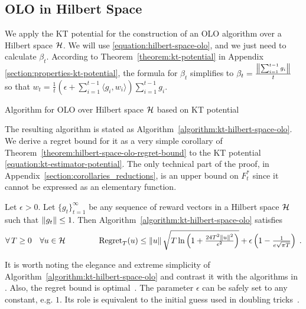 \vspace{-0.1cm}

\subsection{OLO in Hilbert Space}
\label{section:kt-olo}

We apply the KT potential for the construction of an OLO algorithm over a
Hilbert space $\mathcal{H}$. We will use \eqref{equation:hilbert-space-olo}, and we just
need to calculate $\beta_t$. According to Theorem~\ref{theorem:kt-potential} in
Appendix \ref{section:properties-kt-potential}, the formula for $\beta_t$
simplifies to $\beta_t = \frac{\left\|{\sum_{i=1}^{t-1} g_i}\right\|}{t}$ so that $w_t =
\tfrac{1}{t} \left(\epsilon + \sum_{i=1}^{t-1} \langle g_i, w_i \rangle \right)
\sum_{i=1}^{t-1} g_i$.

\begin{algorithm}[t]
\caption{Algorithm for OLO over Hilbert space $\mathcal{H}$ based on KT potential
\label{algorithm:kt-hilbert-space-olo}}
\begin{algorithmic}[1]
{
\ENDFOR
}
\end{algorithmic}
\end{algorithm}

The resulting algorithm is stated as
Algorithm~\ref{algorithm:kt-hilbert-space-olo}.  We derive a regret bound for
it as a very simple corollary of
Theorem~\ref{theorem:hilbert-space-olo-regret-bound} to the KT potential
\eqref{equation:kt-estimator-potential}. The only technical part of the proof,
in Appendix~\ref{section:corollaries_reductions}, is an upper bound on $F_t^*$
since it cannot be expressed as an elementary function.
%
\begin{corollary}
\label{corollary:kt-hilbert-space-olo-regret} Let $\epsilon > 0$. Let
$\{g_t\}_{t=1}^\infty$ be any sequence of reward vectors in a Hilbert space
$\mathcal{H}$ such that $\left\|{g_t}\right\| \le 1$.
Then Algorithm~\ref{algorithm:kt-hilbert-space-olo} satisfies
\[
\forall \, T \ge 0 \quad
\forall u \in \mathcal{H} \qquad \qquad
\operatorname{Regret}_T(u) \le \left\|{u}\right\| \sqrt{T \ln\left(1 + \tfrac{24 T^2 \left\|{u}\right\|^2}{\epsilon^2} \right)} + \epsilon \left(1 - \tfrac{1}{e\sqrt{ \pi T}} \right) \;.
\]
\end{corollary}
%
It is worth noting the elegance and extreme simplicity of
Algorithm~\ref{algorithm:kt-hilbert-space-olo} and contrast it with the
algorithms in \cite{Streeter-McMahan-2012, McMahan-Orabona-2014, Orabona-2013,
Orabona-2014}.  Also, the regret bound is
optimal~\cite{Streeter-McMahan-2012,Orabona-2013}.  The parameter $\epsilon$
can be safely set to any constant, e.g. $1$. Its role is equivalent to the
initial guess used in doubling tricks~\cite{Shalev-Shwartz-2011}.

